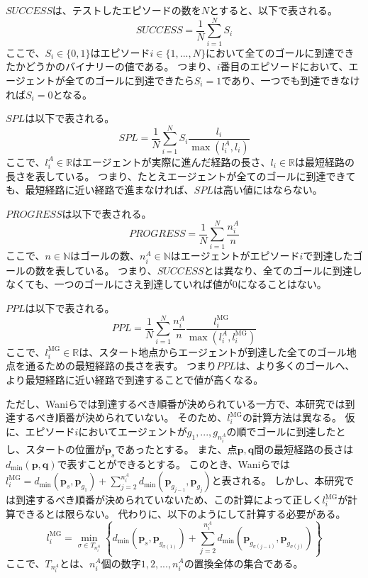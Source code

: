 $SUCCESS$は、テストしたエピソードの数を$N$とすると、以下で表される。
\[
SUCCESS = \frac{1}{N} \sum_{i = 1}^N S_i
\]
ここで、$S_i \in \{0, 1\}$はエピソード$i \in \{1, ..., N\}$において全てのゴールに到達できたかどうかのバイナリーの値である。
つまり、$i$番目のエピソードにおいて、エージェントが全てのゴールに到達できたら$S_i = 1$であり、一つでも到達できなければ$S_i = 0$となる。

$SPL$は以下で表される\cite{anderson2018evaluation}。
\[
SPL = \frac{1}{N} \sum_{i = 1}^N S_i \frac{l_i}{\max(l^A_i, l_i)}
\]
ここで、$l^A_i \in \mathbb{R}$はエージェントが実際に進んだ経路の長さ、$l_i \in \mathbb{R}$は最短経路の長さを表している。
つまり、たとえエージェントが全てのゴールに到達できても、最短経路に近い経路で進まなければ、$SPL$は高い値にはならない。

$PROGRESS$は以下で表される\cite{wani2020multion}。
\[
PROGRESS = \frac{1}{N} \sum_{i = 1}^N \frac{n^A_i}{n}
\]
ここで、$n \in \mathbb{N}$はゴールの数、$n^A_i \in \mathbb{N}$はエージェントがエピソード$i$で到達したゴールの数を表している。
つまり、$SUCCESS$とは異なり、全てのゴールに到達しなくても、一つのゴールにさえ到達していれば値が$0$になることはない。

$PPL$は以下で表される\cite{wani2020multion}。
\[
PPL = \frac{1}{N} \sum_{i = 1}^N \frac{n^A_i}{n} \frac{l^\mathrm{MG}_i}{\max(l^A_i, l^\mathrm{MG}_i)}
\]
ここで、$l^\mathrm{MG}_i \in \mathbb{R}$は、スタート地点からエージェントが到達した全てのゴール地点を通るための最短経路の長さを表す。
つまり$PPL$は、より多くのゴールへ、より最短経路に近い経路で到達することで値が高くなる。

ただし、Waniら\cite{wani2020multion}では到達するべき順番が決められている一方で、本研究では到達するべき順番が決められていない。
そのため、$l^\mathrm{MG}_i$の計算方法は異なる。
仮に、エピソード$i$においてエージェントが$g_1, ..., g_{n^A_i}$の順でゴールに到達したとし、スタートの位置が$\bm{p}_s$であったとする。
また、点$\bm{p}, \bm{q}$間の最短経路の長さは$d_{\mathrm{min}}(\bm{p}, \bm{q})$で表すことができるとする。
このとき、Waniら\cite{wani2020multion}では$l^\mathrm{MG}_i = d_{\mathrm{min}}(\bm{p}_{s}, \bm{p}_{g_1}) + \sum_{j=2}^{n^A_i} d_{\mathrm{min}}(\bm{p}_{g_{j-1}}, \bm{p}_{g_j})$と表される。
しかし、本研究では到達するべき順番が決められていないため、この計算によって正しく$l^\mathrm{MG}_i$が計算できるとは限らない。
代わりに、以下のようにして計算する必要がある。
\[
l^\mathrm{MG}_i = \min_{\sigma \in T_{n^A_i}} \left\{ d_{\mathrm{min}}(\bm{p}_{s}, \bm{p}_{g_{\sigma(1)}}) +  \sum_{j=2}^{n^A_i} d_{\mathrm{min}}(\bm{p}_{g_{\sigma(j-1)}}, \bm{p}_{g_{\sigma(j)}}) \right\}
\]
ここで、$T_{n^A_i}$とは、$n^A_i$個の数字$1, 2, ..., n^A_i$の置換全体の集合である。